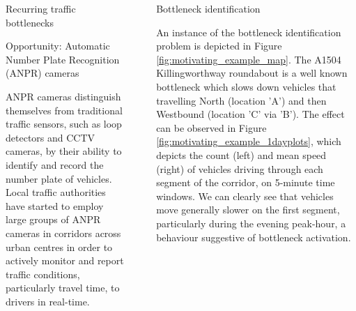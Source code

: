 \documentclass[final]{beamer}
\newlength{\sepwidth}
\newlength{\colwidth}
\newcommand{\separatorcolumn}{\begin{column}{\sepwidth}\end{column}}
\begin{document}
\begin{frame}[t]
\begin{columns}[t]
\begin{column}{\colwidth}
\begin{block}{Recurring traffic bottlenecks}
  \end{block}

  \begin{alertblock}{Opportunity: Automatic Number Plate Recognition (ANPR) cameras}

    ANPR cameras distinguish themselves from traditional traffic sensors, such
    as loop detectors and CCTV cameras, by their ability to identify and record
    the number plate of vehicles. Local traffic authorities have started to
    employ large groups of ANPR cameras in corridors across urban centres in
    order to actively monitor and report traffic conditions, particularly travel
    time, to drivers in real-time.




  \end{alertblock}

\end{column}

\separatorcolumn

\begin{column}{\colwidth}

  \begin{block}{Bottleneck identification }



    An instance of the bottleneck identification problem is depicted in
    Figure \ref{fig:motivating_example_map}. The A1504 Killingworthway
    roundabout is a well known bottleneck which slows down vehicles that
    travelling North (location 'A') and then Westbound (location 'C' via 'B').
    The effect can be observed in Figure \ref{fig:motivating_example_1dayplots},
    which depicts the count (left) and mean speed (right) of vehicles driving
    through each segment of the corridor, on 5-minute time windows. We can
    clearly see that vehicles move generally slower on the first segment,
    particularly during the evening peak-hour, a behaviour suggestive of
    bottleneck activation.


\end{block}
\end{column}
\end{columns}
\end{frame}
\end{document}
